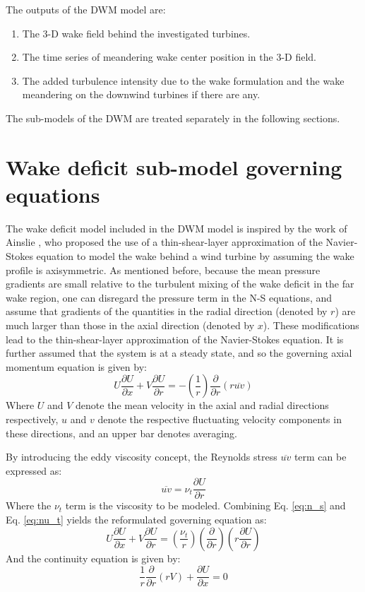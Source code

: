 \documentclass{umthesis}
\begin{document}
The outputs of the DWM model are:
\begin{enumerate}
  \item The 3-D wake field behind the investigated turbines.
  \item The time series of meandering wake center position in the 3-D field.
  \item The added turbulence intensity due to the wake formulation and the wake meandering on the downwind turbines if there are any.
\end{enumerate}

The sub-models of the DWM are treated separately in the following sections.


\section{Wake deficit sub-model governing equations}\label{sec:wake_eqn}
The wake deficit model included in the DWM model is inspired by the work of Ainslie \cite{Ainslie_flow}, who proposed the use of a thin-shear-layer approximation of the Navier-Stokes equation to model the wake behind a wind turbine by assuming the wake profile is axisymmetric. As mentioned before, because the mean pressure gradients are small relative to the turbulent mixing of the wake deficit in the far wake region, one can disregard the pressure term in the N-S equations, and assume that gradients of the quantities in the radial direction (denoted by $r$) are much larger than those in the axial direction (denoted by $x$). These modifications lead to the thin-shear-layer approximation of the Navier-Stokes equation. It is further assumed that the system is at a steady state, and so the governing axial momentum equation is given by:
\begin{equation}\label{eq:n_s}
  U\frac{\partial U}{\partial x}+V\frac{\partial U}{\partial r}=-(\frac{1}{r})\frac{\partial}{\partial r}(r\overline{uv})
\end{equation}
Where $U$ and $V$ denote the mean velocity in the axial and radial directions respectively, $u$ and $v$ denote the respective fluctuating velocity components in these directions, and an upper bar denotes averaging.

By introducing the eddy viscosity concept, the Reynolds stress $\overline{uv}$ term can be expressed as:
\begin{equation}\label{eq:nu_t}
  \overline{uv}=\nu_t\frac{\partial U}{\partial r}
\end{equation}
Where the $\nu_t$ term is the viscosity to be modeled. Combining Eq. \ref{eq:n_s} and Eq. \ref{eq:nu_t} yields the reformulated governing equation as:
\begin{equation}\label{eq:x_momentum_1}
  U\frac{\partial U}{\partial x}+V\frac{\partial U}{\partial r}=(\frac{\nu_t}{r})(\frac{\partial}{\partial r})(r\frac{\partial U}{\partial r})
\end{equation}
And the continuity equation is given by:
\begin{equation}\label{eq:continuity_1}
  \frac{1}{r}\frac{\partial}{\partial r}(rV)+\frac{\partial U}{\partial x}=0
\end{equation}
\end{document}
